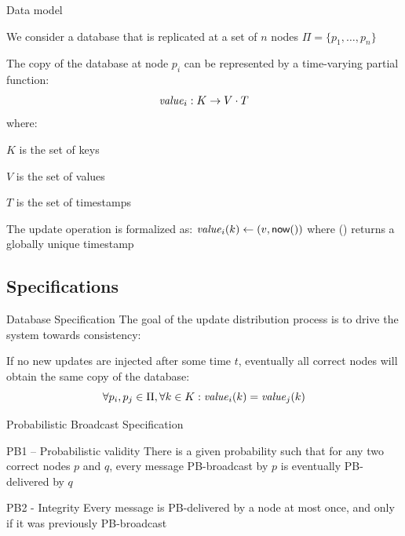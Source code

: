 \begin{frame}{Data model}

\BIL	
\item We consider a database that is replicated at a set of $n$ nodes $\Pi =
\{ p_1, \ldots, p_n \}$
\item The copy of the database at node $p_i$ can be represented by a
time-varying partial function:
\[
  \mathit{value}_i: K \rightarrow V \cdot T
\]
where:
\BI
\item $K$ is the set of \alert{keys}
\item $V$ is the set of \alert{values}
\item $T$ is the set of \alert{timestamps}
\EI
\item The update operation is formalized as: $\mathit{value}_i(k) \gets (v, \textsf{{now}}())$
where \Now() returns a globally unique timestamp 
\EIL

\end{frame}

\subsection{Specifications}

\begin{frame}{Database Specification}
The goal of the update distribution process is to drive the system towards consistency:

\bigskip
\begin{definition}
If no new updates are injected after some time $t$, eventually all correct nodes will
obtain the same copy of the database:
\[
 \forall p_i, p_j \in \Pi, \forall k \in K : \mathit{value}_i(k) = \mathit{value}_j(k)
\]
\end{definition}

\end{frame}

	
\begin{frame}{Probabilistic Broadcast Specification}

	
\bigskip
\begin{block}{PB1 – \alert{Probabilistic validity}}
There is a given probability such that for any two correct nodes $p$ and
$q$, every message PB-broadcast by $p$ is eventually PB-delivered by $q$
\end{block}

\bigskip
\begin{block}{PB2 - \alert{Integrity}}
Every message is PB-delivered by a node at most once, and only if it was previously PB-broadcast
\end{block}

\end{frame}

